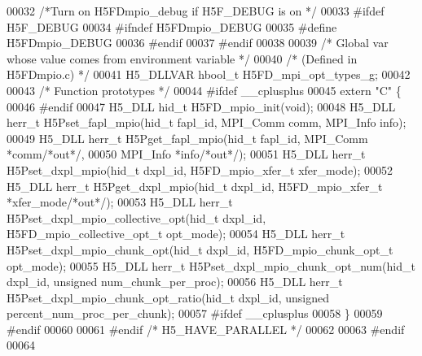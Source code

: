 \begin{DoxyCode}
00032 \textcolor{comment}{/*Turn on H5FDmpio\_debug if H5F\_DEBUG is on */}
00033 \textcolor{preprocessor}{#ifdef H5F\_DEBUG}
00034 \textcolor{preprocessor}{#ifndef H5FDmpio\_DEBUG}
00035 \textcolor{preprocessor}{#define H5FDmpio\_DEBUG}
00036 \textcolor{preprocessor}{#endif}
00037 \textcolor{preprocessor}{#endif}
00038 
00039 \textcolor{comment}{/* Global var whose value comes from environment variable */}
00040 \textcolor{comment}{/* (Defined in H5FDmpio.c) */}
00041 H5\_DLLVAR hbool\_t H5FD\_mpi\_opt\_types\_g;
00042 
00043 \textcolor{comment}{/* Function prototypes */}
00044 \textcolor{preprocessor}{#ifdef \_\_cplusplus}
00045 \textcolor{keyword}{extern} \textcolor{stringliteral}{"C"} \{
00046 \textcolor{preprocessor}{#endif}
00047 H5\_DLL hid\_t H5FD\_mpio\_init(\textcolor{keywordtype}{void});
00048 H5\_DLL herr\_t H5Pset\_fapl\_mpio(hid\_t fapl\_id, MPI\_Comm comm, MPI\_Info info);
00049 H5\_DLL herr\_t H5Pget\_fapl\_mpio(hid\_t fapl\_id, MPI\_Comm *comm\textcolor{comment}{/*out*/},
00050             MPI\_Info *info\textcolor{comment}{/*out*/});
00051 H5\_DLL herr\_t H5Pset\_dxpl\_mpio(hid\_t dxpl\_id, H5FD\_mpio\_xfer\_t xfer\_mode);
00052 H5\_DLL herr\_t H5Pget\_dxpl\_mpio(hid\_t dxpl\_id, H5FD\_mpio\_xfer\_t *xfer\_mode\textcolor{comment}{/*out*/});
00053 H5\_DLL herr\_t H5Pset\_dxpl\_mpio\_collective\_opt(hid\_t dxpl\_id, H5FD\_mpio\_collective\_opt\_t opt\_mode);
00054 H5\_DLL herr\_t H5Pset\_dxpl\_mpio\_chunk\_opt(hid\_t dxpl\_id, H5FD\_mpio\_chunk\_opt\_t opt\_mode);
00055 H5\_DLL herr\_t H5Pset\_dxpl\_mpio\_chunk\_opt\_num(hid\_t dxpl\_id, \textcolor{keywordtype}{unsigned} num\_chunk\_per\_proc);
00056 H5\_DLL herr\_t H5Pset\_dxpl\_mpio\_chunk\_opt\_ratio(hid\_t dxpl\_id, \textcolor{keywordtype}{unsigned} percent\_num\_proc\_per\_chunk);
00057 \textcolor{preprocessor}{#ifdef \_\_cplusplus}
00058 \}
00059 \textcolor{preprocessor}{#endif}
00060 
00061 \textcolor{preprocessor}{#endif }\textcolor{comment}{/* H5\_HAVE\_PARALLEL */}\textcolor{preprocessor}{}
00062 
00063 \textcolor{preprocessor}{#endif}
00064 
\end{DoxyCode}

